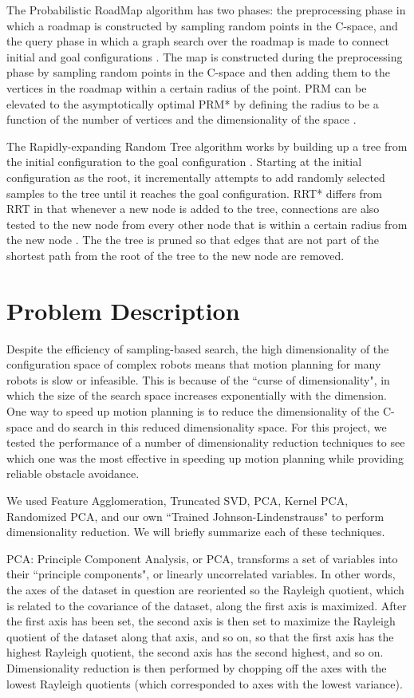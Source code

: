 \documentclass[12pt]{article}
\begin{document}
The Probabilistic RoadMap algorithm has two phases: the preprocessing phase in which a roadmap is constructed by sampling random points in the C-space, and the query phase in which a graph search over the roadmap is made to connect initial and goal configurations \cite{kavraki1996prm}. The map is constructed during the preprocessing phase by sampling random points in the C-space and then adding them to the vertices in the roadmap within a certain radius of the point. PRM can be elevated to the asymptotically optimal PRM* by defining the radius to be a function of the number of vertices and the dimensionality of the space \cite{karaman2011sampling}.

The Rapidly-expanding Random Tree algorithm works by building up a tree from the initial configuration to the goal configuration \cite{lavalle1998rrt}. Starting at the initial configuration as the root, it incrementally attempts to add randomly selected samples to the tree until it reaches the goal configuration. RRT* differs from RRT in that whenever a new node is added to the tree, connections are also tested to the new node from every other node that is within a certain radius from the new node \cite{karaman2011sampling}. The the tree is pruned so that edges that are not part of the shortest path from the root of the tree to the new node are removed. 

\section{Problem Description}

Despite the efficiency of sampling-based search, the high dimensionality of the
configuration space of complex robots means that motion planning for many
robots is slow or infeasible. This is because of the ``curse of dimensionality",
in which the size of the search space increases exponentially with the
dimension. One way to speed up motion planning is to reduce the dimensionality
of the C-space and do search in this reduced dimensionality space. For this
project, we tested the performance of a number of dimensionality reduction
techniques to see which one was the most effective in speeding up motion
planning while providing reliable obstacle avoidance.

We used Feature Agglomeration, Truncated SVD, PCA, Kernel PCA, Randomized PCA, and
our own ``Trained Johnson-Lindenstrauss" to perform dimensionality reduction. We will briefly summarize each of these techniques.

PCA: Principle Component Analysis, or PCA, transforms a set of variables into 
their ``principle components", or linearly uncorrelated variables. In other words, the axes of the dataset in question are reoriented so the Rayleigh quotient, which is related to the covariance of the dataset, along the first axis is maximized. After the first axis has been set, the second axis is then set to maximize the Rayleigh quotient of the dataset along that axis, and so on, so that the first axis has the highest Rayleigh quotient, the second axis has the second highest, and so on. Dimensionality reduction is then performed by chopping off the axes with the lowest Rayleigh quotients (which corresponded to axes with the lowest variance).
\end{document}
